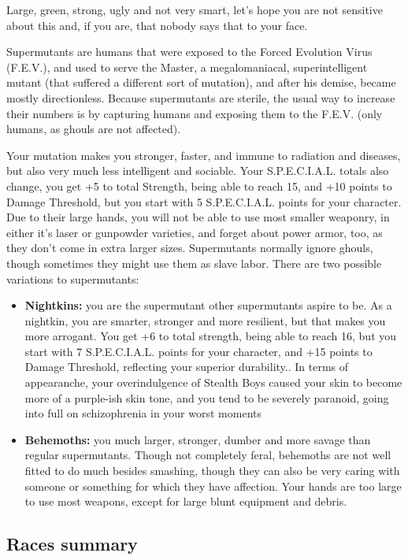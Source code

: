 \documentclass[11pt]{article} %
\begin{document}
Large, green, strong, ugly and not very smart, let's hope you are not sensitive about this and, if you are, that nobody says that to your face. 

Supermutants are humans that were exposed to the Forced Evolution Virus (F.E.V.), and used to serve the Master, a megalomaniacal, superintelligent mutant (that suffered a different sort of mutation), and after his demise, became mostly directionless. Because supermutants are sterile, the usual way to increase their numbers is by capturing humans and exposing them to the F.E.V. (only humans, as ghouls are not affected). 

Your mutation makes you stronger, faster, and immune to radiation and diseases, but also very much less intelligent and sociable. Your S.P.E.C.I.A.L. totals also change, you get +5 to total Strength, being able to reach 15, and +10 points to Damage Threshold, but you start with 5 S.P.E.C.I.A.L. points for your character. Due to their large hands, you will not be able to use most smaller weaponry, in either it's laser or gunpowder varieties, and forget about power armor, too, as they don't come in extra larger sizes. Supermutants normally ignore ghouls, though sometimes they might use them as slave labor. There are two possible variations to supermutants:

\begin{itemize}
	\item \textbf{Nightkins:} you are the supermutant other supermutants aspire to be. As a nightkin, you are smarter, stronger and more resilient, but that makes you more arrogant. You get +6 to total strength, being able to reach 16, but you start with 7 S.P.E.C.I.A.L. points for your character, and +15 points to Damage Threshold, reflecting your superior durability.. In terms of appearanche, your overindulgence of Stealth Boys caused your skin to become more of a purple-ish skin tone, and you tend to be severely paranoid, going into full on schizophrenia in your worst moments
	\item \textbf{Behemoths:} you much larger, stronger, dumber and more savage than regular supermutants. Though not completely feral, behemoths are not well fitted to do much besides smashing, though they can also be very caring with someone or something for which they have affection. Your hands are too large to use most weapons, except for large blunt equipment and debris.
\end{itemize}

\subsection{Races summary}
\end{document}
